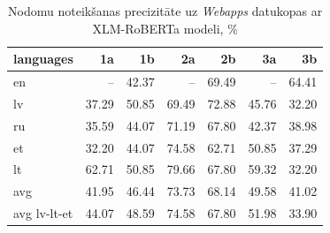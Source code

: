 

\begin{table}[htbp]
  \centering
  \caption{Nodomu noteikšanas precizitāte uz \textit{Webapps} datukopas ar XLM-RoBERTa modeli, \%}
    \begin{tabular}{lrrrrrr}\toprule
    languages & 1a & 1b & 2a & 2b & 3a & 3b \\\midrule

    en    &   --    & \cellcolor[rgb]{ .98,  .725,  .733}42.37 &  --     & \cellcolor[rgb]{ .58,  .702,  .859}69.49 &  --     & \cellcolor[rgb]{ .69,  .78,  .898}64.41 \\
    lv    & \cellcolor[rgb]{ .976,  .569,  .576}37.29 & \cellcolor[rgb]{ .988,  .988,  1}50.85 & \cellcolor[rgb]{ .58,  .702,  .859}69.49 & \cellcolor[rgb]{ .506,  .647,  .831}72.88 & \cellcolor[rgb]{ .98,  .827,  .839}45.76 & \cellcolor[rgb]{ .973,  .412,  .42}32.20 \\
    ru    & \cellcolor[rgb]{ .973,  .514,  .522}35.59 & \cellcolor[rgb]{ .98,  .776,  .788}44.07 & \cellcolor[rgb]{ .541,  .675,  .843}71.19 & \cellcolor[rgb]{ .616,  .725,  .871}67.80 & \cellcolor[rgb]{ .98,  .725,  .733}42.37 & \cellcolor[rgb]{ .976,  .62,  .627}38.98 \\
    et    & \cellcolor[rgb]{ .973,  .412,  .42}32.20 & \cellcolor[rgb]{ .98,  .776,  .788}44.07 & \cellcolor[rgb]{ .467,  .624,  .82}74.58 & \cellcolor[rgb]{ .729,  .808,  .91}62.71 & \cellcolor[rgb]{ .988,  .988,  1}50.85 & \cellcolor[rgb]{ .976,  .569,  .576}37.29 \\
    lt    & \cellcolor[rgb]{ .729,  .808,  .91}62.71 & \cellcolor[rgb]{ .988,  .988,  1}50.85 & \cellcolor[rgb]{ .353,  .541,  .776}79.66 & \cellcolor[rgb]{ .616,  .725,  .871}67.80 & \cellcolor[rgb]{ .804,  .859,  .937}59.32 & \cellcolor[rgb]{ .973,  .412,  .42}32.20 \\\bottomrule
    avg   & 41.95 & 46.44 & 73.73 & 68.14 & 49.58 & 41.02 \\
    avg lv-lt-et & 44.07 & 48.59 & 74.58 & 67.80 & 51.98 & 33.90 \\
    \end{tabular}%
  \label{tab:webapps-xml}%
\end{table}%



